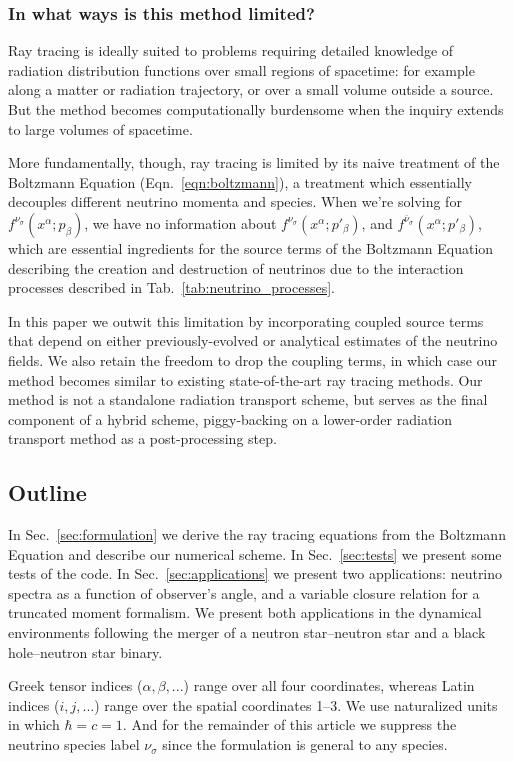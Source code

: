 \documentclass[aps,floatfix,prd,superscriptaddress,twocolumn]{revtex4-1}
\newcommand{\todo}[1]{\marginpar{\tiny{\textcolor{red}{#1}}}}
\begin{document}
\subsubsection*{In what ways is this method limited?}
Ray tracing is ideally suited to problems requiring detailed knowledge of
radiation distribution functions over small regions of spacetime:
for example along a matter or radiation trajectory,
or over a small volume outside a source.
But the method becomes computationally burdensome when the inquiry extends
to large volumes of spacetime.

More fundamentally, though, ray tracing is limited by its naive
treatment of the Boltzmann Equation (Eqn.~\ref{eqn:boltzmann}),
a treatment which essentially decouples different neutrino momenta and species.
\todo{clarify how momenta are decoupled}
When we're solving for $f^{\nu_\sigma}(x^\alpha;p_\beta)$, we have no
information about $f^{\nu_\sigma}(x^\alpha;p'_\beta)$, and
$f^{\bar{\nu}_\sigma}(x^\alpha;p'_\beta)$, which are essential ingredients
for the source terms of the Boltzmann Equation describing the creation and
destruction of neutrinos due to the interaction processes described in
Tab.~\ref{tab:neutrino_processes}.

In this paper we outwit this limitation by incorporating coupled source terms
that depend on either previously-evolved or analytical
estimates of the neutrino fields.
We also retain the freedom to drop the coupling terms, in which case our method
becomes similar to existing state-of-the-art ray tracing methods.
Our method is not a standalone radiation transport scheme,
but serves as the final component of a hybrid scheme,
piggy-backing on a lower-order radiation transport method as a
post-processing step.

\subsection{Outline}
In Sec.~\ref{sec:formulation} we derive the ray tracing equations from the
Boltzmann Equation and describe our numerical scheme.
In Sec.~\ref{sec:tests} we present some tests of the code.
In Sec.~\ref{sec:applications} we present two applications:
neutrino spectra as a function of observer's angle, and
a variable closure relation for a truncated moment formalism.
We present both applications in the dynamical environments following the merger
of a neutron star--neutron star and a black hole--neutron star binary.

Greek tensor indices ($\alpha, \beta, ...$) range over all four coordinates,
whereas Latin indices ($i, j, ...$) range over the spatial coordinates 1--3.
We use naturalized units in which $\hbar=c=1$.
And for the remainder of this article we suppress the neutrino species label
$\nu_\sigma$ since the formulation is general to any species.
\end{document}
